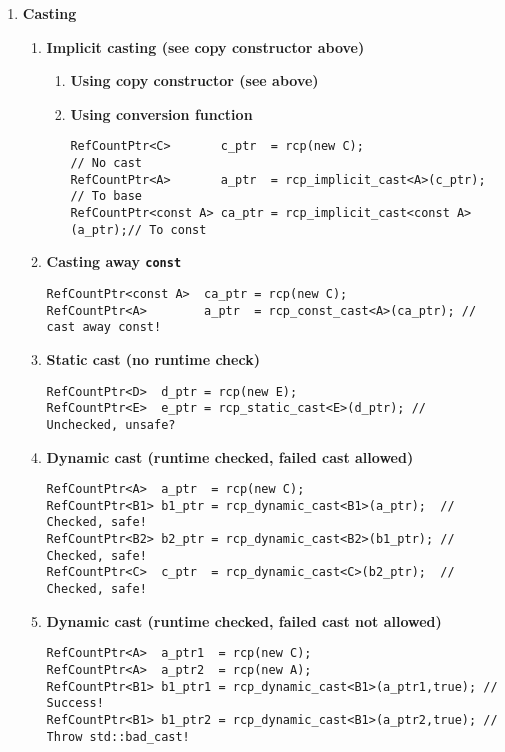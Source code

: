 \documentclass[pdf,ps2pdf,11pt]{SANDreport}
\begin{document}
\begin{enumerate}
\item {\bf Casting}
\label{rcpqs:apdx:qs:casting}
%
\begin{enumerate}
%
\item {\bf Implicit casting (see copy constructor above)}
%
\begin{enumerate}
%
\item {\bf Using copy constructor (see above)}
%
\item {\bf Using conversion function}
%
{\small\begin{verbatim}
RefCountPtr<C>       c_ptr  = rcp(new C);                       // No cast
RefCountPtr<A>       a_ptr  = rcp_implicit_cast<A>(c_ptr);      // To base
RefCountPtr<const A> ca_ptr = rcp_implicit_cast<const A>(a_ptr);// To const
\end{verbatim}}
%
\end{enumerate}
%
\item {\bf Casting away \texttt{const}}
%
{\small\begin{verbatim}
RefCountPtr<const A>  ca_ptr = rcp(new C);
RefCountPtr<A>        a_ptr  = rcp_const_cast<A>(ca_ptr); // cast away const!
\end{verbatim}}
%
\item {\bf Static cast (no runtime check)}
%
{\small\begin{verbatim}
RefCountPtr<D>  d_ptr = rcp(new E);
RefCountPtr<E>  e_ptr = rcp_static_cast<E>(d_ptr); // Unchecked, unsafe?
\end{verbatim}}
%
\item {\bf Dynamic cast (runtime checked, failed cast allowed)}
%
{\small\begin{verbatim}
RefCountPtr<A>  a_ptr  = rcp(new C);
RefCountPtr<B1> b1_ptr = rcp_dynamic_cast<B1>(a_ptr);  // Checked, safe!
RefCountPtr<B2> b2_ptr = rcp_dynamic_cast<B2>(b1_ptr); // Checked, safe!
RefCountPtr<C>  c_ptr  = rcp_dynamic_cast<C>(b2_ptr);  // Checked, safe!
\end{verbatim}}
%
\item {\bf Dynamic cast (runtime checked, failed cast not allowed)}
%
{\small\begin{verbatim}
RefCountPtr<A>  a_ptr1  = rcp(new C);
RefCountPtr<A>  a_ptr2  = rcp(new A);
RefCountPtr<B1> b1_ptr1 = rcp_dynamic_cast<B1>(a_ptr1,true); // Success!
RefCountPtr<B1> b1_ptr2 = rcp_dynamic_cast<B1>(a_ptr2,true); // Throw std::bad_cast!
\end{verbatim}}
%
\end{enumerate}

\pagebreak


\end{enumerate}
\end{document}
